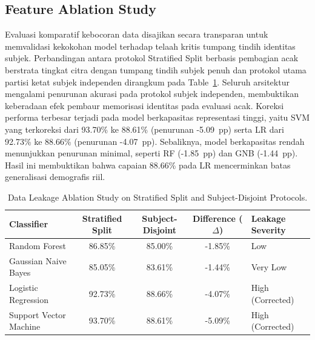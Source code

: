 \subsection{Feature Ablation Study}
\label{sec:feature_ablation}
\label{sec:feature_ablation_study}

Evaluasi komparatif kebocoran data disajikan secara transparan untuk memvalidasi kekokohan model terhadap telaah kritis tumpang tindih identitas subjek. Perbandingan antara protokol Stratified Split berbasis pembagian acak berstrata tingkat citra dengan tumpang tindih subjek penuh dan protokol utama partisi ketat subjek independen dirangkum pada Table~\ref{tab:XIII}. Seluruh arsitektur mengalami penurunan akurasi pada protokol subjek independen, membuktikan keberadaan efek pembaur memorisasi identitas pada evaluasi acak. Koreksi performa terbesar terjadi pada model berkapasitas representasi tinggi, yaitu SVM yang terkoreksi dari 93.70\% ke 88.61\% (penurunan -5.09~pp) serta LR dari 92.73\% ke 88.66\% (penurunan -4.07~pp). Sebaliknya, model berkapasitas rendah menunjukkan penurunan minimal, seperti RF (-1.85~pp) dan GNB (-1.44~pp). Hasil ini membuktikan bahwa capaian 88.66\% pada LR mencerminkan batas generalisasi demografis riil.

\begin{table}[htbp]
\caption{Data Leakage Ablation Study on Stratified Split and Subject-Disjoint Protocols.}
\label{tab:13}
\label{tab:XIII}
\centering
\footnotesize
\setlength{\tabcolsep}{8pt}
\begin{tabular}{lcccl}
\toprule
\textbf{Classifier} & \textbf{Stratified Split} & \textbf{Subject-Disjoint} & \textbf{Difference ($\Delta$)} & \textbf{Leakage Severity} \\
\midrule
Random Forest & 86.85\% & 85.00\% & -1.85\% & Low \\
Gaussian Naive Bayes & 85.05\% & 83.61\% & -1.44\% & Very Low \\
Logistic Regression & 92.73\% & 88.66\% & -4.07\% & High (Corrected) \\
Support Vector Machine & 93.70\% & 88.61\% & -5.09\% & High (Corrected) \\
\bottomrule
\end{tabular}
\end{table}

